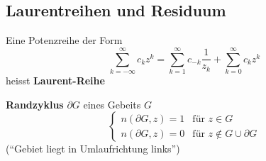 \subsection{Laurentreihen und Residuum}
\begin{def*}[note = Laurent-Reihe , index = Laurent Reihe , indexformat = {1!~-2 2!1-~}]
	Eine Potenzreihe der Form
	\[ \sum_{k = -\infty}^{\infty} c_k z^k = \sum_{k=1}^{\infty} c_{-k} \frac{1}{z_k} + \sum_{k=0}^{\infty} c_k z^k \]
	heisst \textbf{Laurent-Reihe}
\end{def*}
\begin{def*}[note = Randzyklus , index = Rand zyklus , indexformat = {1.2 2!~.1}]
	\textbf{Randzyklus} $\partial G$ eines Gebeits $G$
	\[ \begin{cases}
		n(\partial G,z) = 1 &\text{für } z \in G \\
		n(\partial G,z) = 0 &\text{für } z \notin G \cup \partial G
	\end{cases} \]
	(\enquote{Gebiet liegt in Umlaufrichtung links})
\end{def*}
